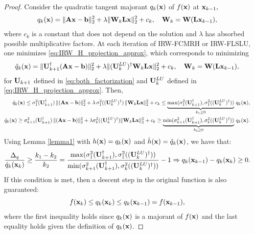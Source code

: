 \documentclass[10pt,a4paper]{amsart}
\newcommand{\bfA}{{\bf A}}
\newcommand{\bfL}{{\bf L}}
\newcommand{\bfU}{{\bf U}}
\newcommand{\bfW}{{\bf W}}
\newcommand{\bfb}{{\bf b}}
\newcommand{\bfx}{{\bf x}}
\begin{document}
\begin{proof}
Consider the quadratic tangent majorant  $q_k(\bfx)$ of $f(\bfx)$ at $\bfx_{k-1},$ 
\begin{equation*}
   q_k(\bfx) = \| \bfA \bfx - \bfb \|_2^2 + \lambda \|\bfW_k \bfL \bfx \|_2^2 + c_k, \quad \bfW_k =\bfW(\bfL \bfx_{k-1}),
\end{equation*}
where $c_k$ is a constant that does not depend on the solution and $\lambda$ has absorbed possible multiplicative factors. At each iteration of IRW-FCMRH or IRW-FLSLU, one minimizes \eqref{eq:IRW_H_projection_approx}, which corresponds to minimizing 
\begin{equation*}
   \hat q_k(\bfx) = \| \bfU_{k+1}^{\dagger} (\bfA \bfx - \bfb) \|_2^2 + \lambda \|(\bfU_{k}^{LU})^{\dagger} \bfW_k \bfL \bfx \|_2^2 + c_k, \quad \bfW_k =\bfW(\bfL \bfx_{k-1}),
\end{equation*}
for $\bfU_{k+1}$ defined in  \eqref{eq:both_factorization} and $\bfU^{LU}_{k}$ defined in \eqref{eq:IRW_H_projection_approx}. Then,
\begin{eqnarray*}
   \hat q_k(\bfx) \leq \sigma_1^2(\bfU_{k+1}^{\dagger})\, \| (\bfA \bfx - \bfb) \|_2^2 + \lambda \,\sigma_1^2((\bfU_{k}^{LU})^{\dagger} )\, \|\bfW_k \bfL \bfx \|_2^2  + c_k  \leq \underbrace{\max(\sigma_1^2(\bfU_{k+1}^{\dagger}),\sigma_1^2((\bfU_{k}^{LU})^{\dagger}))}_{k_1 \geq 0 } \, q_k(\bfx), \\
 \hat q_k(\bfx) \geq \sigma_{k+1}^2(\bfU_{k+1}^{\dagger})\, \| (\bfA \bfx - \bfb) \|_2^2 + \lambda \sigma_{k}^2((\bfU_{k}^{LU})^{\dagger}) \|\bfW_k \bfL \bfx \|_2^2  + c_k  \geq \underbrace{\min(\sigma_{k+1}^2(\bfU_{k+1}^{\dagger}),\sigma_k^2((\bfU_{k}^{LU})^{\dagger}))}_{k_2 \geq 0 } \, q_k(\bfx).
\end{eqnarray*}
Using Lemma \ref{lemma1} with $h(\bfx) = q_{k}(\bfx) $ and $\hat h(\bfx) = \hat q_{k}(\bfx) $, we have that:
\[\frac{\Delta_q}{\hat q_k(\bfx_{k})} \geq \frac{k_1-k_2}{k_2}= \frac{\max(\sigma_1^2(\bfU_{k+1}^{\dagger}),\sigma_1^2((\bfU_{k}^{LU})^{\dagger}))}{\min(\sigma_{k+1}^2(\bfU_{k+1}^{\dagger}),\sigma_k^2((\bfU_{k}^{LU})^{\dagger}))}-1 \Rightarrow  q_k(\bfx_{k-1}) - q_k(\bfx_{k}) \geq 0.\]
If this condition is met, then a descent step in the original function is also guaranteed:
\[f(\bfx_{k}) \leq q_k(\bfx_{k}) \leq q_k(\bfx_{k-1}) = f(\bfx_{k-1}), 
\]
where the first inequality holds since $ q_k(\bfx)$ is a majorant of $f(\bfx)$ and the last equality holds given the definition of $ q_k(\bfx)$. 
\end{proof}
\end{document}
